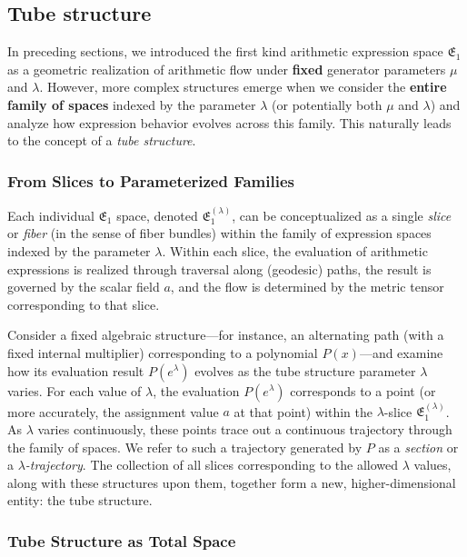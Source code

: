 \subsection{Tube structure}\label{sec:tubestructure}

In preceding sections, we introduced the first kind arithmetic expression space $\mathfrak{E}_1$ as a geometric realization of arithmetic flow under \textbf{fixed} generator parameters $\mu$ and $\lambda$. However, more complex structures emerge when we consider the \textbf{entire family of spaces} indexed by the parameter $\lambda$ (or potentially both $\mu$ and $\lambda$) and analyze how expression behavior evolves across this family. This naturally leads to the concept of a \emph{tube structure}.

\subsubsection{From Slices to Parameterized Families}\label{subsec:tube_slices}

Each individual $\mathfrak{E}_1$ space, denoted $\mathfrak{E}_1^{(\lambda)}$, can be conceptualized as a single \emph{slice} or \emph{fiber} (in the sense of fiber bundles) within the family of expression spaces indexed by the parameter $\lambda$. Within each slice, the evaluation of arithmetic expressions is realized through traversal along (geodesic) paths, the result is governed by the scalar field $a$, and the flow is determined by the metric tensor corresponding to that slice.

Consider a fixed algebraic structure—for instance, an alternating path (with a fixed internal multiplier) corresponding to a polynomial $P(x)$—and examine how its evaluation result $P(e^\lambda)$ evolves as the tube structure parameter $\lambda$ varies. For each value of $\lambda$, the evaluation $P(e^\lambda)$ corresponds to a point (or more accurately, the assignment value $a$ at that point) within the $\lambda$-slice $\mathfrak{E}_1^{(\lambda)}$. As $\lambda$ varies continuously, these points trace out a continuous trajectory through the family of spaces. We refer to such a trajectory generated by $P$ as a \emph{section} or a \emph{$\lambda$-trajectory}. The collection of all slices corresponding to the allowed $\lambda$ values, along with these structures upon them, together form a new, higher-dimensional entity: the tube structure.

\subsubsection{Tube Structure as Total Space}\label{subsec:tube_total_space}

